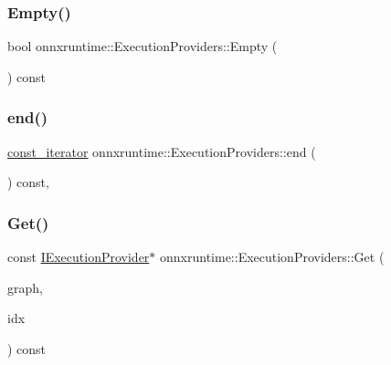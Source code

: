 \subsubsection{\texorpdfstring{Empty()}{Empty()}}
{\footnotesize\ttfamily bool onnxruntime\+::\+Execution\+Providers\+::\+Empty (\begin{DoxyParamCaption}{ }\end{DoxyParamCaption}) const\hspace{0.3cm}{\ttfamily [inline]}}

\mbox{\label{classonnxruntime_1_1ExecutionProviders_a7ef8bcdee18b9ff7e59141171cb79ed3}} 
\subsubsection{\texorpdfstring{end()}{end()}}
{\footnotesize\ttfamily \mbox{\hyperlink{classonnxruntime_1_1ExecutionProviders_a2eb06c44e805e428aa26b1bfe12348fb}{const\+\_\+iterator}} onnxruntime\+::\+Execution\+Providers\+::end (\begin{DoxyParamCaption}{ }\end{DoxyParamCaption}) const\hspace{0.3cm}{\ttfamily [inline]}, {\ttfamily [noexcept]}}

\mbox{\label{classonnxruntime_1_1ExecutionProviders_aa824632f2f7215f2087e8b061d054663}} 
\subsubsection{\texorpdfstring{Get()}{Get()}\hspace{0.1cm}{\footnotesize\ttfamily [1/4]}}
{\footnotesize\ttfamily const \mbox{\hyperlink{classonnxruntime_1_1IExecutionProvider}{I\+Execution\+Provider}}$\ast$ onnxruntime\+::\+Execution\+Providers\+::\+Get (\begin{DoxyParamCaption}\item[{const \mbox{\hyperlink{classonnxruntime_1_1Graph}{onnxruntime\+::\+Graph}} \&}]{graph,  }\item[{const \mbox{\hyperlink{namespaceonnxruntime_af8773b5c12b5d8fd9292eb2e268df760}{onnxruntime\+::\+Node\+Index}} \&}]{idx }\end{DoxyParamCaption}) const\hspace{0.3cm}{\ttfamily [inline]}}

